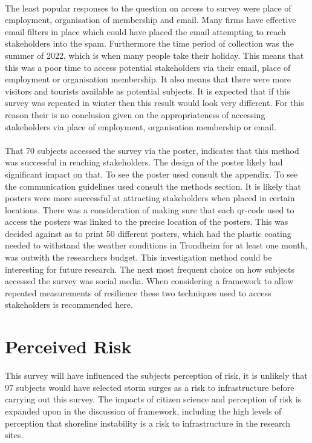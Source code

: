 \paragraph{}
The least popular responses to the question on access to survey were place of employment, organisation of membership and email. Many firms have effective email filters in place which could have placed the email attempting to reach stakeholders into the spam. Furthermore the time period of collection was the summer of 2022, which is when many people take their holiday. This means that this was a poor time to access potential stakeholders via their email, place of employment or organisation membership. It also means that there were more visitors and tourists available as potential subjects. It is expected that if this survey was repeated in winter then this result would look very different. For this reason their is no conclusion given on the appropriateness of accessing stakeholders via place of employment, organisation membership or email.
\paragraph{}
That 70 subjects accessed the survey via the poster, indicates that this method was successful in reaching stakeholders. The design of the poster likely had significant impact on that. To see the poster used consult the appendix. To see the communication guidelines used consult the methods section. It is likely that posters were more successful at attracting stakeholders when placed in certain locations. There was a consideration of making sure that each qr-code used to access the posters was linked to the precise location of the posters. This was decided against as to print 50 different posters, which had the plastic coating needed to withstand the weather conditions in Trondheim for at least one month, was outwith the researchers budget. This investigation method could be interesting for future research. The next most frequent choice on how subjects accessed the survey was social media. When considering a framework to allow repeated measurements of resilience these two techniques used to access stakeholders is recommended here. 
\paragraph{}

\section{Perceived Risk}
This survey will have influenced the subjects perception of risk, it is unlikely that 97 subjects would have selected storm surges as a risk to infrastructure before carrying out this survey. The impacts of citizen science and perception of risk is expanded upon in the discussion of framework, including the high levels of perception that shoreline instability is a risk to infrastructure in the research sites.

